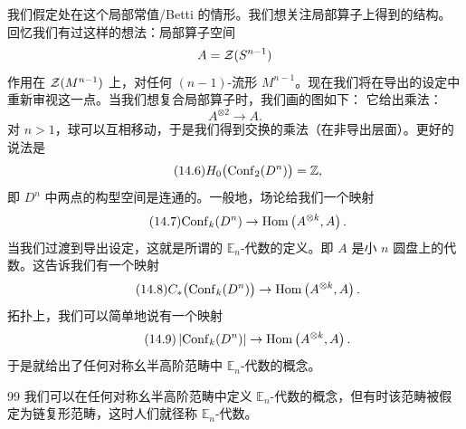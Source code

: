 我们假定处在这个局部常值/Betti 的情形。我们想关注局部算子上得到的结构。回忆我们有过这样的想法：局部算子空间
\begin{equation*}
A=\mathcal{Z}(S^{n-1})
\end{equation*}
作用在 $\mathcal{Z}(M^{n-1})$ 上，对任何 $(n-1)$-流形 $M^{n-1}$。现在我们将在导出的设定中重新审视这一点。当我们想复合局部算子时，我们画的图如下：
它给出乘法：
\begin{equation}\tag{14.5}
A^{\otimes2}\to A.
\end{equation}
对 $n>1$，球可以互相移动，于是我们得到交换的乘法（在非导出层面）。更好的说法是
\begin{equation}\tag{14.6}
H_0\bigl(\mathrm{Conf}_2(D^n)\bigr)=\mathbb{Z},
\end{equation}
即 $D^n$ 中两点的构型空间是连通的。一般地，场论给我们一个映射
\begin{equation}\tag{14.7}
\mathrm{Conf}_k(D^n)\to\mathrm{Hom}\left(A^{\otimes k},A\right).
\end{equation}
当我们过渡到导出设定，这就是所谓的 $\mathbb{E}_n$-代数的定义。即 $A$ 是小 $n$ 圆盘上的代数。这告诉我们有一个映射
\begin{equation}\tag{14.8}
C_*\bigl(\mathrm{Conf}_k(D^n)\bigr)\to\mathrm{Hom}\left(A^{\otimes k},A\right).
\end{equation}
拓扑上，我们可以简单地说有一个映射
\begin{equation}\tag{14.9}
\left|\mathrm{Conf}_k(D^n)\right|\to\mathrm{Hom}\left(A^{\otimes k},A\right).
\end{equation}
于是就给出了任何对称幺半高阶范畴中 $\mathbb{E}_n$-代数的概念。

\begin{srcrem}{99}
我们可以在任何对称幺半高阶范畴中定义 $\mathbb{E}_n$-代数的概念，但有时该范畴被假定为链复形范畴，这时人们就径称 $\mathbb{E}_n$-代数。
\end{srcrem}

